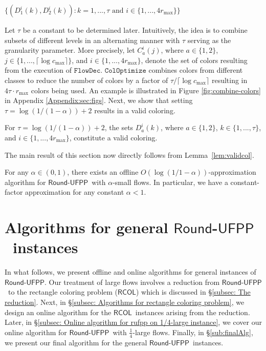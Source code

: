 \documentclass[a4paper,UKenglish]{lipics-v2016}
\newcommand{\rufpp}{\mbox{$\mathsf{Round}$-$\mathsf{UFPP}$}}
\newcommand{\rcol}{\mbox{$\mathsf{RCOL}$}}
\theoremstyle{plain}
\newcommand{\rmax}{r_{\max}}
\newcommand{\cmax}{c_{\max}}
\begin{document}
\begin{algorithm}
\BlankLine
\For{$i\leftarrow 1$ \KwTo $4\rmax$}{
\For{$k\leftarrow 1$ \KwTo $\tau$}{
$D^i_1(k) \leftarrow  \bigcup_{z=0}^{\lceil(\log \cmax)/\tau\rceil-1} C^i_1(z\tau+k)$\;
$D^i_2(k) \leftarrow  \bigcup_{z=0}^{\lceil(\log \cmax)/\tau\rceil-1} C^i_2(z\tau+k)$\;
}
}
\Return $\{(D^i_1(k), D^i_2(k)) : k=1, ..., \tau \text{ and } i\in\{1,...,4r_{\max}\}\}$\;
\caption{$\mathtt{ColOptimize}$}\label{algo:colopt}
\end{algorithm}\DecMargin{1em}

Let $\tau$ be a constant to be determined later. Intuitively, the idea is to combine subsets of different levels in an alternating manner with $\tau$ serving as the granularity parameter. More precisely, let $C^i_a(j)$, where $a\in\{1,2\}$, $j\in\{1,...,\lceil\log \cmax\rceil\}$, and $i\in\{1,...,4r_{\max}\}$, denote the set of colors resulting from the execution of $\mathtt{FlowDec}$. $\mathtt{ColOptimize}$ combines colors from different classes to reduce the number of colors by a factor of $\tau/\lceil\log \cmax\rceil$ resulting in $4\tau\cdot\rmax$ colors being used. An example is illustrated in Figure \ref{fig:combine-colors} in Appendix \ref{Appendix:sec:figs}. Next, we show that setting $\tau=\log(1/(1-\alpha)) +2$ results in a valid coloring.

\begin{lemma}\label{lem:validcol}
For $\tau=\log(1/(1-\alpha)) +2$, the sets $D^i_a(k)$, where $a\in\{1,2\}$, $k\in\{1,...,\tau\}$, and $i\in\{1,...,4r_{\max}\}$, constitute a valid coloring.
\end{lemma}

The main result of this section now directly follows from Lemma~\ref{lem:validcol}.

\begin{theorem}
For any $\alpha\in(0,1)$, there exists an offline $O(\log(1/1-\alpha))$-approximation algorithm for \rufpp\ with $\alpha$-small flows.  In particular, we have a constant-factor approximation for any constant $\alpha < 1$. 
\end{theorem}


\section{Algorithms for general \rufpp\ instances}\label{sec:large_flows}
In what follows, we present offline and online algorithms for general instances of \rufpp. Our treatment of large flows involves a reduction from \rufpp\ to the rectangle coloring problem (\rcol) which is discussed in \S\ref{subsec: The reduction}. Next, in \S\ref{subsec: Algorithms for rectangle coloring problem}, we design an online algorithm for the \rcol\ instances arising from the reduction. Later, in \S\ref{subsec: Online algorithm for rufpp on 1/4-large instance}, we cover our online algorithm for \rufpp\ with $\frac{1}{4}$-large flows. Finally, in \S\ref{sub:finalAlg}, we present our final algorithm for the general \rufpp\ instances.
\end{document}
